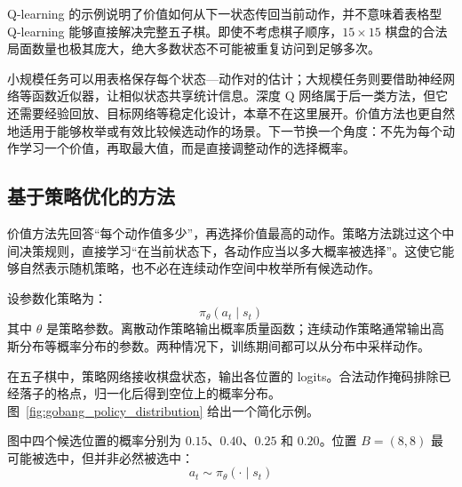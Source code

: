 \documentclass[UTF8,a4paper,zihao=-4,oneside,openany]{ctexbook}
\begin{document}
\begin{importantnote}
Q-learning 的示例说明了价值如何从下一状态传回当前动作，并不意味着表格型 Q-learning 能够直接解决完整五子棋。即使不考虑棋子顺序，$15\times15$ 棋盘的合法局面数量也极其庞大，绝大多数状态不可能被重复访问到足够多次。
\end{importantnote}

小规模任务可以用表格保存每个状态—动作对的估计；大规模任务则要借助神经网络等函数近似器，让相似状态共享统计信息。深度 Q 网络属于后一类方法，但它还需要经验回放、目标网络等稳定化设计，本章不在这里展开。价值方法也更自然地适用于能够枚举或有效比较候选动作的场景。下一节换一个角度：不先为每个动作学习一个价值，再取最大值，而是直接调整动作的选择概率。

\subsection{基于策略优化的方法}

价值方法先回答“每个动作值多少”，再选择价值最高的动作。策略方法跳过这个中间决策规则，直接学习“在当前状态下，各动作应当以多大概率被选择”。这使它能够自然表示随机策略，也不必在连续动作空间中枚举所有候选动作。

设参数化策略为：
\begin{equation}
\pi_{\theta}(a_t\mid s_t)
\end{equation}
其中 $\theta$ 是策略参数。离散动作策略输出概率质量函数；连续动作策略通常输出高斯分布等概率分布的参数。两种情况下，训练期间都可以从分布中采样动作。

在五子棋中，策略网络接收棋盘状态，输出各位置的 logits。合法动作掩码排除已经落子的格点，归一化后得到空位上的概率分布。图~\ref{fig:gobang_policy_distribution} 给出一个简化示例。

%       

图中四个候选位置的概率分别为 $0.15$、$0.40$、$0.25$ 和 $0.20$。位置 $B=(8,8)$ 最可能被选中，但并非必然被选中：
\begin{equation}
a_t
\sim
\pi_{\theta}(\cdot\mid s_t)
\end{equation}
\end{document}
